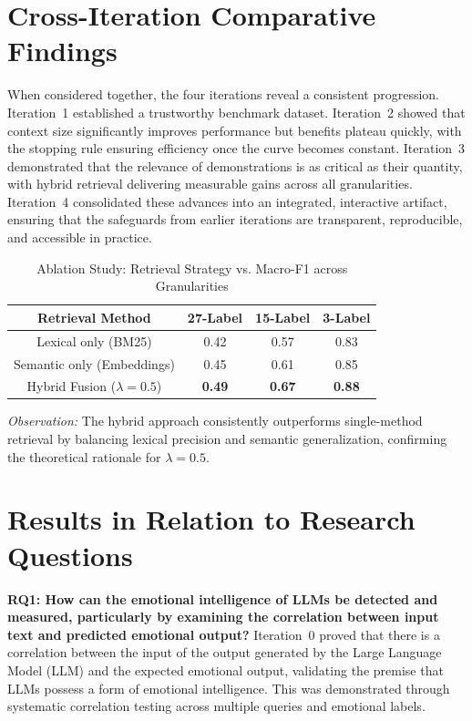 \section{Cross-Iteration Comparative Findings}

When considered together, the four iterations reveal a consistent progression. Iteration~1 established a trustworthy benchmark dataset. Iteration~2 showed that context size significantly improves performance but benefits plateau quickly, with the stopping rule ensuring efficiency once the curve becomes constant. Iteration~3 demonstrated that the relevance of demonstrations is as critical as their quantity, with hybrid retrieval delivering measurable gains across all granularities. Iteration~4 consolidated these advances into an integrated, interactive artifact, ensuring that the safeguards from earlier iterations are transparent, reproducible, and accessible in practice.  

\begin{table}[H]
\centering
\caption{Ablation Study: Retrieval Strategy vs. Macro-F1 across Granularities}
\begin{tabular}{|c|c|c|c|}
\hline
\textbf{Retrieval Method} & \textbf{27-Label} & \textbf{15-Label} & \textbf{3-Label} \\ \hline
Lexical only (BM25) & 0.42 & 0.57 & 0.83 \\ \hline
Semantic only (Embeddings) & 0.45 & 0.61 & 0.85 \\ \hline
Hybrid Fusion ($\lambda = 0.5$) & \textbf{0.49} & \textbf{0.67} & \textbf{0.88} \\ \hline
\end{tabular}
\end{table}

\noindent
\textit{Observation:} The hybrid approach consistently outperforms single-method retrieval by balancing lexical precision and semantic generalization, confirming the theoretical rationale for $\lambda=0.5$.

\section{Results in Relation to Research Questions}
\textbf{RQ1: How can the emotional intelligence of LLMs be detected and measured, particularly by examining the correlation between input text and predicted emotional output?}  
Iteration~0 proved that there is a correlation between the input of the output generated by the Large Language Model (LLM) and the expected emotional output, validating the premise that LLMs possess a form of emotional intelligence. This was demonstrated through systematic correlation testing across multiple queries and emotional labels.  

